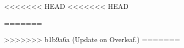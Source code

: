 

% 
% 
\setcounter{chapter}{1}
<<<<<<< HEAD
<<<<<<< HEAD

% 
% 
=======


>>>>>>> b1b9a6a (Update on Overleaf.)
=======

% 
% 
% 
% 

